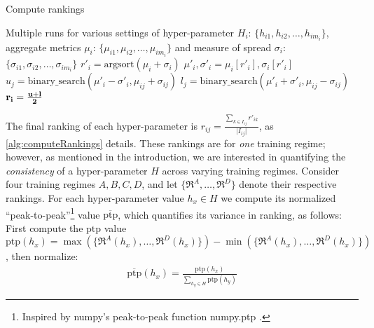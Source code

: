 \begin{algorithm}[!t]
\caption{Compute rankings}\label{alg:computeRankings}
\begin{algorithmic}[1]
\Require Multiple runs for various settings of hyper-parameter $H_i$: $\lbrace h_{i1},h_{i2},\ldots,h_{im_i}\rbrace$, aggregate metrics $\mu_i$: $\lbrace \mu_{i1},\mu_{i2},\ldots,\mu_{im_i}\rbrace$ and measure of spread $\sigma_i$: $\lbrace \sigma_{i1},\sigma_{i2},\ldots,\sigma_{im_i}\rbrace$
    \State $r'_{i} = \textrm{argsort}(\mu_i + \sigma_i)$ 
    \State $\mu'_i, \sigma'_i = \mu_i[r'_{i}], \sigma_i[r'_{i}]$ 
        \State $u_{j} = \textrm{binary\_search}(\mu'_i - \sigma'_i, \mu_{ij} + \sigma_{ij})$ 
        \State $l_{j} = \textrm{binary\_search}(\mu'_i + \sigma'_i, \mu_{ij} - \sigma_{ij})$ 
    \EndFor
    \State $\bf{r_{i}} = \frac{u + l}{2}$ 
\EndFor

\end{algorithmic}
\end{algorithm}

The final ranking of each hyper-parameter is $r_{ij} = \frac{\sum_{k \in I_{ij}} r
'_{ik}}{\vert I_{ij} \vert}$, 
as \autoref{alg:computeRankings} details. These rankings are for {\em one} training regime; however, as mentioned in the introduction, we are interested in quantifying the {\em consistency} of a hyper-parameter $H$ across varying training regimes. Consider four training regimes $A, B, C, D$, and let $\lbrace \mathfrak{R}^A,\ldots,\mathfrak{R}^D\rbrace$ denote their respective rankings. For each hyper-parameter value $h_x\in H$ we compute its normalized ``peak-to-peak''\footnote{Inspired by numpy's peak-to-peak function numpy.ptp \citep{harris2020array}.} value $\overline{\textrm{ptp}}$, which quantifies its variance in ranking, as follows: First compute the $\textrm{ptp}$ value $\textrm{ptp}(h_x) = \max\left(\lbrace \mathfrak{R}^A(h_x),\ldots,\mathfrak{R}^D(h_x)\rbrace\right) - \min\left(\lbrace \mathfrak{R}^A(h_x),\ldots,\mathfrak{R}^D(h_x)\rbrace\right)$, then normalize:
\begin{align}
    \overline{\textrm{ptp}}(h_x) = \frac{\textrm{ptp}(h_x)}{\sum_{h_y\in H}\textrm{ptp}(h_y)}
    \label{eqn:ptp}
\end{align}

